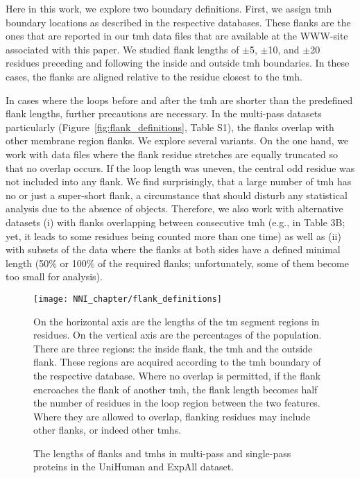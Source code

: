 Here in this work, we explore two boundary definitions. First, we assign \gls{tmh} boundary locations as described in the respective databases. These flanks are the ones that are reported in our \gls{tmh} data files that are available at the WWW-site associated with this paper. We studied flank lengths of $\pm$5, $\pm$10, and $\pm$20 residues preceding and following the inside and outside \gls{tmh} boundaries. In these cases, the flanks are aligned relative to the residue closest to the \gls{tmh}.

In cases where the loops before and after the \gls{tmh} are shorter than the predefined flank lengths, further precautions are necessary. In the multi-pass datasets particularly (Figure~\ref{fig:flank_definitions}, Table S1), the flanks overlap with other membrane region flanks. We explore several variants. On the one hand, we work with data files where the flank residue stretches are equally truncated so that no overlap occurs. If the loop length was uneven, the central odd residue was not included into any flank. We find surprisingly, that a large number of \gls{tmh} has no or just a super-short flank, a circumstance that should disturb any statistical analysis due to the absence of objects. Therefore, we also work with alternative datasets (i) with flanks overlapping between consecutive \gls{tmh} (e.g., in Table 3B; yet, it leads to some residues being counted more than one time) as well as (ii) with subsets of the data where the flanks at both sides have a defined minimal length (50\% or 100\% of the required flanks; unfortunately, some of them become too small for analysis).

\begin{figure}[!ht]
\centering
\texttt{[image: NNI\_chapter/flank\_definitions]}
\caption{The lengths of flanks and \gls{tmh}s in multi-pass and single-pass proteins in the UniHuman and ExpAll dataset.}
\medskip
\justify
\small
On the horizontal axis are the lengths of the \gls{tm} segment regions in residues. On the vertical axis are the percentages of the population. There are three regions: the inside flank, the \gls{tmh} and the outside flank. These regions are acquired according to the \gls{tmh} boundary of the respective database. Where no overlap is permitted, if the flank encroaches the flank of another \gls{tmh}, the flank length becomes half the number of residues in the loop region between the two features. Where they are allowed to overlap, flanking residues may include other flanks, or indeed other \gls{tmh}s.
\label{fig:hydrophobicity_scale_comparison}
\end{figure}

